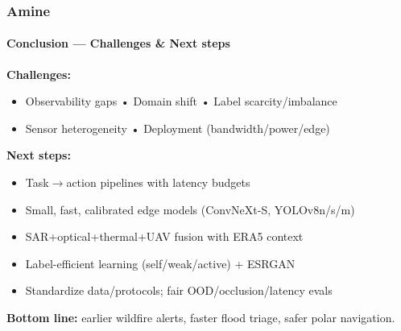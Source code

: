 \documentclass{beamer}
\newcommand{\namedframe}[3]{
  \begin{frame}
    \frametitle{#1}
    \framesubtitle{#2}
    #3
  \end{frame}
}
\begin{document}
\namedframe{Amine}{Conclusion — Challenges \& Next steps}{
\small
\textbf{Challenges:}
\begin{itemize}
  \item Observability gaps • Domain shift • Label scarcity/imbalance
  \item Sensor heterogeneity • Deployment (bandwidth/power/edge)
\end{itemize}
\textbf{Next steps:}
\begin{itemize}
  \item Task$\to$action pipelines with latency budgets
  \item Small, fast, calibrated edge models (ConvNeXt-S, YOLOv8n/s/m)
  \item SAR+optical+thermal+UAV fusion with ERA5 context
  \item Label-efficient learning (self/weak/active) + ESRGAN
  \item Standardize data/protocols; fair OOD/occlusion/latency evals
\end{itemize}
\textbf{Bottom line:} earlier wildfire alerts, faster flood triage, safer polar navigation.
}
\end{document}
